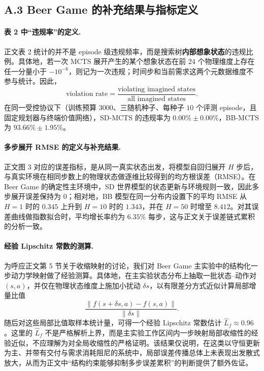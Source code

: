 \documentclass[UTF8]{ctexart}
\let\oldparagraph\paragraph
\renewcommand{\paragraph}[1]{\oldparagraph{#1}\mbox{}}
\begin{document}
\hypertarget{a.3-beer-game-supplementary-results}{%
\subsection{A.3 Beer Game 的补充结果与指标定义}\label{a.3-beer-game-supplementary-results}}

\paragraph{表 2 中“违规率”的定义.}
正文表 2 统计的并不是 episode 级违规频率，而是搜索树\textbf{内部想象状态}的违规比例。具体地，若一次 MCTS 展开产生的某个想象状态在前 \(24\) 个物理维度上存在任一分量小于 \(-10^{-6}\)，则记为一次违规；时间步和当前需求这两个元数据维度不参与统计。因此，
\[
\text{violation rate}
=
\frac{\text{violating imagined states}}{\text{all imagined states}}.
\]
在同一受控协议下（训练预算 \(3000\)、三随机种子、每种子 \(10\) 个评测 episode，且固定规划器与终端价值网络），SD-MCTS 的违规率为 \(0.00\%\pm0.00\%\)，BB-MCTS 为 \(93.66\%\pm1.95\%\)。

\paragraph{多步展开 RMSE 的定义与补充结果.}
正文图 3 对应的误差指标，是从同一真实状态出发，将模型自回归展开 \(H\) 步后，与真实环境在相同步数上的物理状态做逐维比较得到的均方根误差（RMSE）。在 Beer Game 的确定性主环境中，SD 世界模型的状态更新与环境规则一致，因此多步展开误差保持为 \(0\)；相对地，BB 模型在同一分布内设置下的平均 RMSE 从 \(H=1\) 时的 \(0.345\) 上升到 \(H=10\) 时的 \(1.343\)，并在 \(H=50\) 时增至 \(8.412\)。对其误差曲线做指数拟合时，平均增长率约为 \(6.35\%\) 每步，这与正文关于误差链式累积的分析一致。

\paragraph{经验 Lipschitz 常数的测算.}
为呼应正文第 5 节关于收缩映射的讨论，我们对 Beer Game 主实验中的结构化一步动力学映射做了经验测算。具体地，在主实验状态分布上抽取一批状态--动作对 \((s,a)\)，并仅在物理状态维度上施加小扰动 \(\delta s\)，以有限差分方式近似计算局部增量比值
\[
\frac{\|f(s+\delta s,a)-f(s,a)\|}{\|\delta s\|}.
\]
随后对这些局部比值取样本统计量，可得一个经验 Lipschitz 常数估计 \(\hat{L}_f \approx 0.96\)。这里的 \(\hat{L}_f\) 不是严格解析上界，而是主实验工作区间内一步映射局部收缩性的经验近似，不应理解为对全局收缩性的严格证明。该结果仅说明，在这类以守恒更新为主、并带有交付与需求消耗阻尼的系统中，局部误差传播总体上未表现出发散式放大，从而为正文中“结构约束能够抑制多步误差累积”的判断提供了额外佐证。
\end{document}
